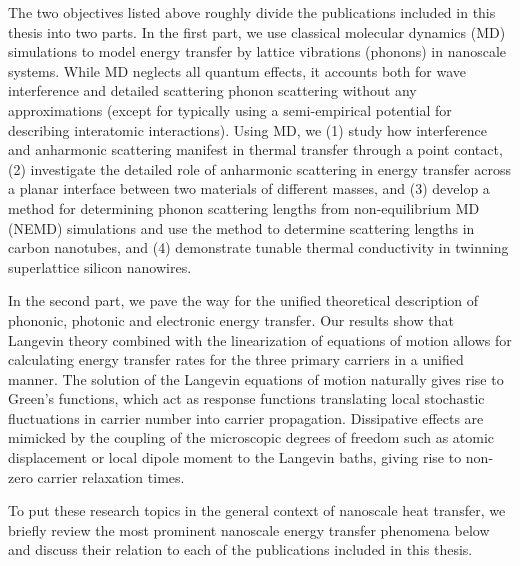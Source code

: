 The two objectives listed above roughly divide the publications included in this thesis into two parts. In the first part, we use classical molecular dynamics (MD) simulations to model energy transfer by lattice vibrations (phonons) in nanoscale systems. While MD neglects all quantum effects, it accounts both for wave interference and detailed scattering phonon scattering without any approximations (except for typically using a semi-empirical potential for describing interatomic interactions). Using MD, we (1) study how interference and anharmonic scattering manifest in thermal transfer through a point contact, (2) investigate the detailed role of anharmonic scattering in energy transfer across a planar interface between two materials of different masses, and (3) develop a method for determining phonon scattering lengths from non-equilibrium MD (NEMD) simulations and use the method to determine scattering lengths in carbon nanotubes, and (4) demonstrate tunable thermal conductivity in twinning superlattice silicon nanowires.

In the second part, we pave the way for the unified theoretical description of phononic, photonic and electronic energy transfer. Our results show that Langevin theory \cite{langevin,zwanzig} combined with the linearization of equations of motion allows for calculating energy transfer rates for the three primary carriers in a unified manner. The solution of the Langevin equations of motion naturally gives rise to Green's functions, which act as response functions translating local stochastic fluctuations in carrier number into carrier propagation. Dissipative effects are mimicked by the coupling of the microscopic degrees of freedom such as atomic displacement or local dipole moment to the Langevin baths, giving rise to non-zero carrier relaxation times.

To put these research topics in the general context of nanoscale heat transfer, we briefly review the most prominent nanoscale energy transfer phenomena below and discuss their relation to each of the publications included in this thesis. 


